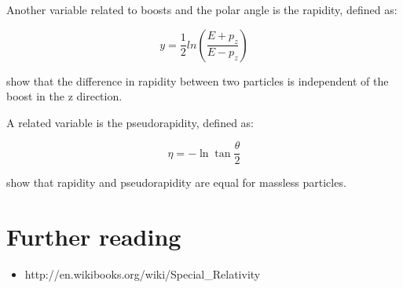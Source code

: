Another variable related to boosts and the polar angle is the rapidity, defined as:

\begin{equation}
	 y =  \frac{1}{2} ln (\frac{E + p_z}{E-p_z})
\end{equation} 
	  

\vspace{.2cm} 
\begin{minipage}{0.9\textwidth} 
\begin{framed}
\begin{exercise}
{show that the difference in rapidity between two particles is independent of the boost in the z direction.}
\end{exercise}
\end{framed} 
\end{minipage}
\vspace{.2cm}




A related variable is the pseudorapidity, defined as:

\begin{equation}
	 \eta  = - \ln{\tan{\frac{\theta}{2}}}
\end{equation} 


\vspace{.2cm} 
\begin{minipage}{0.9\textwidth} 
\begin{framed}
\begin{exercise}
{show that rapidity and pseudorapidity are equal for massless particles.}
\end{exercise}
\end{framed} 
\end{minipage}
\vspace{.2cm}



\section{Further reading}
\begin{itemize}	
\item http://en.wikibooks.org/wiki/Special\_Relativity
\end{itemize}

